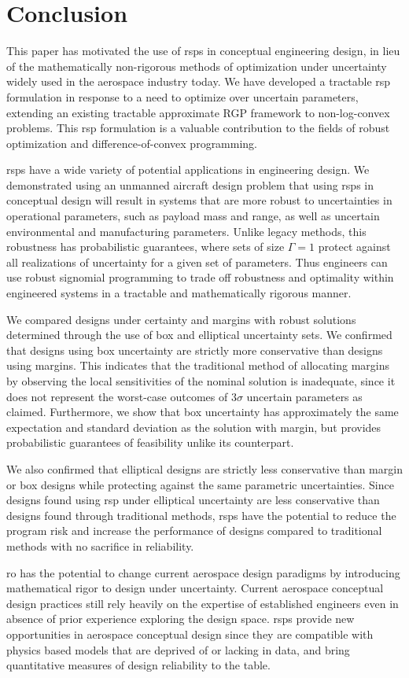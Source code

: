 \section{Conclusion}

This paper has motivated the use of \gls{rsp}s in conceptual engineering
design, in lieu of the mathematically non-rigorous methods of optimization under uncertainty
widely used in the aerospace industry today. We have developed a tractable \gls{rsp} formulation
in response to a need to optimize over uncertain parameters, extending an
existing tractable approximate RGP framework to non-log-convex problems.
This \gls{rsp} formulation is a valuable contribution to the fields of robust
optimization and difference-of-convex programming.

\gls{rsp}s have a wide variety of potential applications in engineering design.
We demonstrated using an unmanned aircraft design problem
that using \gls{rsp}s in conceptual design will result in systems
that are more robust to uncertainties in operational parameters,
such as payload mass and range, as well as uncertain environmental and manufacturing parameters.
Unlike legacy methods, this robustness has probabilistic guarantees, where sets of size $\Gamma=1$
protect against all realizations of uncertainty for a given set of parameters.
Thus engineers can use robust signomial programming to trade off
robustness and optimality within engineered systems in a tractable and mathematically rigorous manner.

We compared designs under certainty and margins with robust solutions
determined through the use of box and elliptical uncertainty sets. We
confirmed that designs using box uncertainty are strictly more conservative
than designs using margins. This indicates that the traditional method of allocating margins
by observing the local sensitivities of the nominal solution is inadequate, since it does not
represent the worst-case outcomes of $3\sigma$ uncertain parameters as claimed.
Furthermore, we show that box uncertainty
has approximately the same expectation and standard deviation as the solution with margin,
but provides probabilistic guarantees of feasibility unlike its counterpart.

We also confirmed that elliptical designs are strictly less conservative
than {\color{blue}margin or box designs} while protecting against the same
parametric uncertainties. Since designs found using \gls{rsp}
under elliptical uncertainty are less conservative
than designs found through traditional methods, \gls{rsp}s have the potential to reduce
the program risk and increase the performance
of designs compared to traditional methods with no sacrifice in reliability.

\gls{ro} has the potential to change current aerospace design paradigms by introducing
mathematical rigor to design under uncertainty. Current aerospace
conceptual design practices still rely heavily on the expertise of established
engineers even in absence of prior experience exploring the design space.
\gls{rsp}s provide new opportunities in aerospace conceptual design
since they are compatible with physics based models
that are deprived of or lacking in data, and bring quantitative
measures of design reliability to the table.
